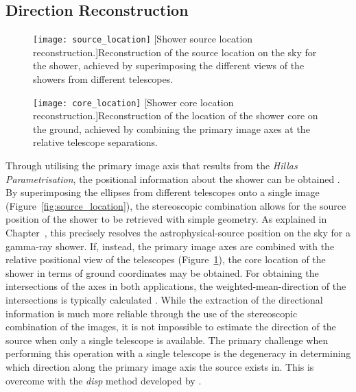 \subsection{Direction Reconstruction}

\begin{figure}
\begin{minipage}[t]{.49\textwidth}
  \centering
  \texttt{[image: source\_location]} 
  [Shower source location reconstruction.]{Reconstruction of the source location on the sky for the shower, achieved by superimposing the different views of the showers from different telescopes.}
  \label{fig:source_location}
\end{minipage}%
\hfill
\begin{minipage}[t]{.49\textwidth}
  \centering
  \texttt{[image: core\_location]}
  [Shower core location reconstruction.]{Reconstruction of the location of the shower core on the ground, achieved by combining the primary image axes at the relative telescope separations.}
  \label{fig:core_location}
\end{minipage}
\end{figure}

Through utilising the primary image axis that results from the \textit{Hillas Parametrisation}, the positional information about the shower can be obtained \cite{Daum1997,Cogan2006,Dickinson2010}. By superimposing the ellipses from different telescopes onto a single image (Figure~\ref{fig:source_location}), the stereoscopic combination allows for the source position of the shower to be retrieved with simple geometry. As explained in Chapter~, this precisely  resolves the astrophysical-source position on the sky  for a gamma-ray shower. If, instead, the primary image axes are combined with the relative positional view of the telescopes (Figure~\ref{fig:core_location}), the core location of the shower in terms of ground coordinates may be obtained. For obtaining the intersections of the axes in both applications, the weighted-mean-direction of the intersections is typically calculated \cite{Eschbach2016,Bernlohr2013a}. While the extraction of the directional information is much more reliable through the use of the stereoscopic combination of the images, it is not impossible to estimate the direction of the source when only a single telescope is available. The primary challenge when performing this operation with a single telescope is the degeneracy in determining which direction along the primary image axis the source exists in. This is overcome with the \textit{disp} method developed by \textcite{Lessard2001}.

